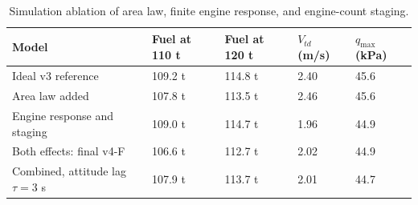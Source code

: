 \begin{table}[htbp]
\caption{Simulation ablation of area law, finite engine response, and engine-count staging.}
\label{tab:src18}
\small
\setlength{\tabcolsep}{3.5pt}
\begin{tabularx}{\linewidth}{@{}p{.36\linewidth}XXXX@{}}
\toprule
Model & Fuel at 110 t & Fuel at 120 t & $V_{td}$ (m/s) & $q_{\max}$ (kPa) \\
\midrule
Ideal v3 reference & 109.2 t & 114.8 t & 2.40 & 45.6 \\
Area law added & 107.8 t & 113.5 t & 2.46 & 45.6 \\
Engine response and staging & 109.0 t & 114.7 t & 1.96 & 44.9 \\
Both effects: final v4-F & 106.6 t & 112.7 t & 2.02 & 44.9 \\
Combined, attitude lag $\tau=3$ s & 107.9 t & 113.7 t & 2.01 & 44.7 \\
\bottomrule
\end{tabularx}
\par{}
\end{table}
